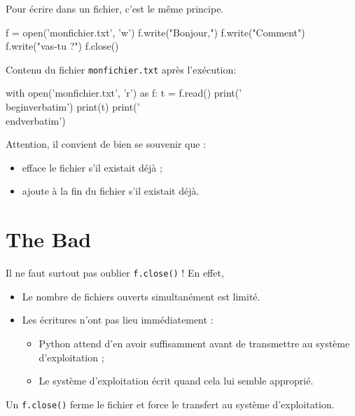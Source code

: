 Pour écrire dans un fichier, c'est le même principe.
\begin{pyconsole}
f = open('monfichier.txt', 'w')
f.write("Bonjour,\n")
f.write("Comment")
f.write("vas-tu ?")
f.close()
\end{pyconsole}




Contenu du fichier \texttt{monfichier.txt} après l'exécution:
%

\begin{pycode}
with open('monfichier.txt', 'r') as f:
  t = f.read()
print('\\begin{verbatim}')
print(t)
print('\\end{verbatim}')
\end{pycode}

Attention, il convient de bien se souvenir que : 
\begin{itemize}
\item {} efface le fichier  s'il existait déjà ;
\item {} ajoute à la fin du fichier  s'il existait déjà.
\end{itemize}

\section{The Bad}

Il ne faut surtout pas oublier \verb+f.close()+ ! En effet,
\begin{itemize}
\item[\textbullet] Le nombre de fichiers ouverts simultanément est limité.
\item[\textbullet] Les écritures n'ont pas lieu immédiatement :
  \begin{itemize}
  \item Python attend d'en avoir suffisamment avant de transmettre au système d'exploitation ;
  \item Le système d'exploitation écrit quand cela lui semble approprié.
  \end{itemize}
\end{itemize}
Un \verb+f.close()+ ferme le fichier et force le transfert au système d'exploitation.

